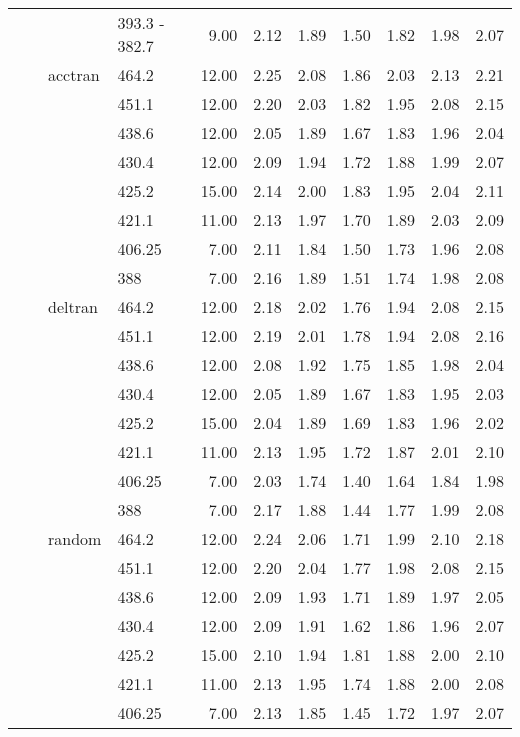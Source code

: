 \begin{longtable}{llllrrrrrrr}
   &  &  & 393.3 - 382.7 & 9.00 & 2.12 & 1.89 & 1.50 & 1.82 & 1.98 & 2.07 \\ 
   &  & acctran & 464.2 & 12.00 & 2.25 & 2.08 & 1.86 & 2.03 & 2.13 & 2.21 \\ 
   &  &  & 451.1 & 12.00 & 2.20 & 2.03 & 1.82 & 1.95 & 2.08 & 2.15 \\ 
   &  &  & 438.6 & 12.00 & 2.05 & 1.89 & 1.67 & 1.83 & 1.96 & 2.04 \\ 
   &  &  & 430.4 & 12.00 & 2.09 & 1.94 & 1.72 & 1.88 & 1.99 & 2.07 \\ 
   &  &  & 425.2 & 15.00 & 2.14 & 2.00 & 1.83 & 1.95 & 2.04 & 2.11 \\ 
   &  &  & 421.1 & 11.00 & 2.13 & 1.97 & 1.70 & 1.89 & 2.03 & 2.09 \\ 
   &  &  & 406.25 & 7.00 & 2.11 & 1.84 & 1.50 & 1.73 & 1.96 & 2.08 \\ 
   &  &  & 388 & 7.00 & 2.16 & 1.89 & 1.51 & 1.74 & 1.98 & 2.08 \\ 
   &  & deltran & 464.2 & 12.00 & 2.18 & 2.02 & 1.76 & 1.94 & 2.08 & 2.15 \\ 
   &  &  & 451.1 & 12.00 & 2.19 & 2.01 & 1.78 & 1.94 & 2.08 & 2.16 \\ 
   &  &  & 438.6 & 12.00 & 2.08 & 1.92 & 1.75 & 1.85 & 1.98 & 2.04 \\ 
   &  &  & 430.4 & 12.00 & 2.05 & 1.89 & 1.67 & 1.83 & 1.95 & 2.03 \\ 
   &  &  & 425.2 & 15.00 & 2.04 & 1.89 & 1.69 & 1.83 & 1.96 & 2.02 \\ 
   &  &  & 421.1 & 11.00 & 2.13 & 1.95 & 1.72 & 1.87 & 2.01 & 2.10 \\ 
   &  &  & 406.25 & 7.00 & 2.03 & 1.74 & 1.40 & 1.64 & 1.84 & 1.98 \\ 
   &  &  & 388 & 7.00 & 2.17 & 1.88 & 1.44 & 1.77 & 1.99 & 2.08 \\ 
   &  & random & 464.2 & 12.00 & 2.24 & 2.06 & 1.71 & 1.99 & 2.10 & 2.18 \\ 
   &  &  & 451.1 & 12.00 & 2.20 & 2.04 & 1.77 & 1.98 & 2.08 & 2.15 \\ 
   &  &  & 438.6 & 12.00 & 2.09 & 1.93 & 1.71 & 1.89 & 1.97 & 2.05 \\ 
   &  &  & 430.4 & 12.00 & 2.09 & 1.91 & 1.62 & 1.86 & 1.96 & 2.07 \\ 
   &  &  & 425.2 & 15.00 & 2.10 & 1.94 & 1.81 & 1.88 & 2.00 & 2.10 \\ 
   &  &  & 421.1 & 11.00 & 2.13 & 1.95 & 1.74 & 1.88 & 2.00 & 2.08 \\ 
   &  &  & 406.25 & 7.00 & 2.13 & 1.85 & 1.45 & 1.72 & 1.97 & 2.07 \\ 

\end{longtable}
